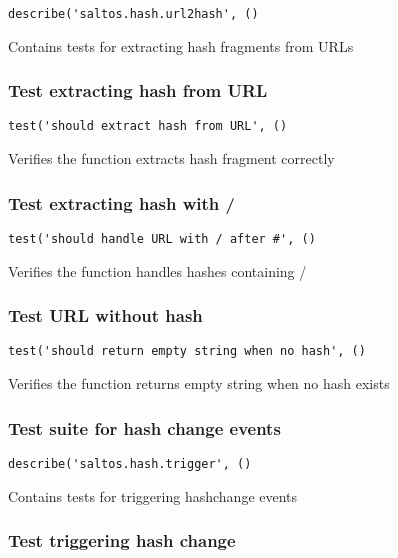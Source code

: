 \documentclass[a4paper]{article}
\begin{document}
\begin{lstlisting}
describe('saltos.hash.url2hash', ()
\end{lstlisting}

Contains tests for extracting hash fragments from URLs

\hypertarget{toc215}{}
\subsubsection{Test extracting hash from URL}

\begin{lstlisting}
test('should extract hash from URL', ()
\end{lstlisting}

Verifies the function extracts hash fragment correctly

\hypertarget{toc216}{}
\subsubsection{Test extracting hash with /}

\begin{lstlisting}
test('should handle URL with / after #', ()
\end{lstlisting}

Verifies the function handles hashes containing /

\hypertarget{toc217}{}
\subsubsection{Test URL without hash}

\begin{lstlisting}
test('should return empty string when no hash', ()
\end{lstlisting}

Verifies the function returns empty string when no hash exists

\hypertarget{toc218}{}
\subsubsection{Test suite for hash change events}

\begin{lstlisting}
describe('saltos.hash.trigger', ()
\end{lstlisting}

Contains tests for triggering hashchange events

\hypertarget{toc219}{}
\subsubsection{Test triggering hash change}
\end{document}
